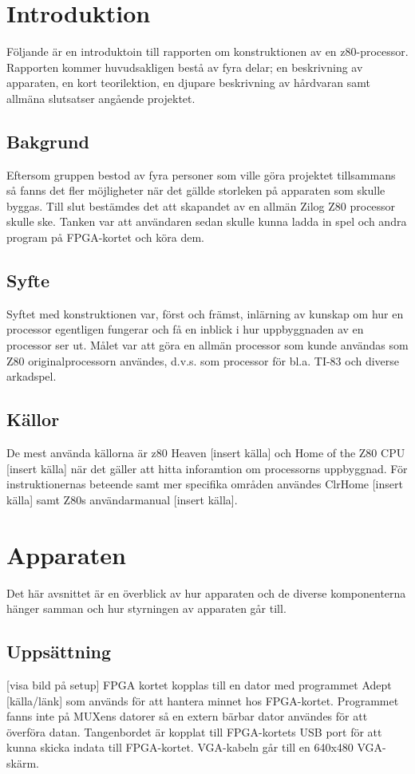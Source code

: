 \documentclass{article}
\begin{document}
\maketitle

\clearpage
\section{Introduktion}
Följande är en introduktoin till rapporten om konstruktionen av en z80-processor. Rapporten kommer huvudsakligen bestå av fyra delar; en beskrivning av apparaten, en kort teorilektion, en djupare beskrivning av hårdvaran samt allmäna slutsatser angående projektet.
\subsection{Bakgrund}
Eftersom gruppen bestod av fyra personer som ville göra projektet tillsammans så fanns det fler möjligheter när det gällde storleken på apparaten som skulle byggas. Till slut bestämdes det att skapandet av en allmän Zilog Z80 processor skulle ske. Tanken var att användaren sedan skulle kunna ladda in spel och andra program på FPGA-kortet och köra dem.
\subsection{Syfte}
Syftet med konstruktionen var, först och främst, inlärning av kunskap om hur en processor egentligen fungerar och få en inblick i hur uppbyggnaden av en processor ser ut. Målet var att göra en allmän processor som kunde användas som Z80 originalprocessorn användes, d.v.s. som processor för bl.a. TI-83 och diverse arkadspel.
\subsection{Källor}
De mest använda källorna är z80 Heaven [insert källa] och Home of the Z80 CPU [insert källa] när det gäller att hitta inforamtion om processorns uppbyggnad. För instruktionernas beteende samt mer specifika områden användes ClrHome [insert källa] samt Z80s användarmanual [insert källa].

\clearpage
\section{Apparaten}
Det här avsnittet är en överblick av hur apparaten och de diverse komponenterna hänger samman och hur styrningen av apparaten går till.
\subsection{Uppsättning}
[visa bild på setup] FPGA kortet kopplas till en dator med programmet Adept [källa/länk] som används för att hantera minnet hos FPGA-kortet. Programmet fanns inte på MUXens datorer så en extern bärbar dator användes för att överföra datan. Tangenbordet är kopplat till FPGA-kortets USB port för att kunna skicka indata till FPGA-kortet. VGA-kabeln går till en 640x480 VGA-skärm.
\end{document}
